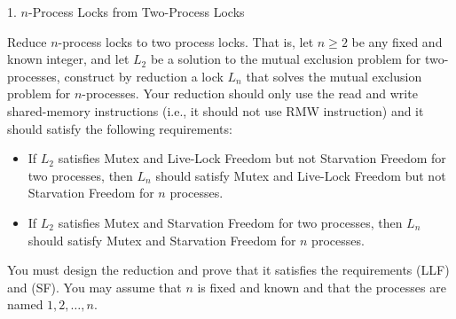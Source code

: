 \documentclass[12pt]{article}
\begin{document}


\begin{problem}{1. $n$-Process Locks from Two-Process Locks}

    Reduce $n$-process locks to two process locks. That is, let $n \geq 2$ be any fixed and known integer, and let $L_2$ be a solution to the mutual exclusion problem for two-processes, construct by reduction a lock $L_n$ that solves the mutual exclusion problem for $n$-processes. Your reduction should only use the read and write shared-memory instructions (i.e., it should not use RMW instruction) and it should satisfy the following requirements:
    \begin{itemize}
        \item[(LLF)] If $L_2$ satisfies Mutex and Live-Lock Freedom but not Starvation Freedom for two processes, then $L_n$ should satisfy Mutex and Live-Lock Freedom but not Starvation Freedom for $n$ processes.
        \item[(SF)] If $L_2$ satisfies Mutex and Starvation Freedom for two processes, then $L_n$ should satisfy Mutex and Starvation Freedom for $n$ processes.
    \end{itemize}
    You must design the reduction and prove that it satisfies the requirements (LLF) and (SF). You may assume that $n$ is fixed and known and that the processes are named $1, 2, \ldots, n$.
\end{problem}
\end{document}
